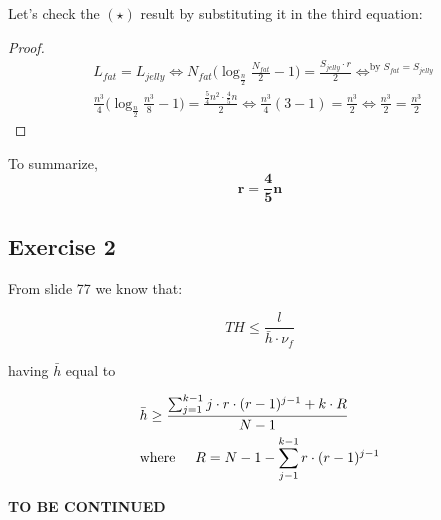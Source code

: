 \documentclass{article}
\begin{document}
Let's check the $(\star)$ result by substituting it in the third equation:

\begin{proof}
    \begin{equation}
        \begin{split}
            &L_{fat} = L_{jelly} \Leftrightarrow N_{fat} \Big(\log_{\frac{n}{2}} \frac{N_{fat}}{2} - 1\Big) = \frac{S_{jelly} \cdot r}{2} \Leftrightarrow^{\text{by } S_{fat} = S_{jelly}}\\ 
            &\frac{n^3}{4} \Big(\log_{\frac{n}{2}} \frac{n^3}{8} - 1\Big) = \frac{\frac{5}{4} n^2 \cdot \frac{4}{5} n}{2} \Leftrightarrow \frac{n^3}{4}(3-1) = \frac{n^3}{2} \Leftrightarrow \frac{n^3}{2} = \frac{n^3}{2}
        \end{split}
    \end{equation}
\end{proof}

To summarize, $$\mathbf{r = \frac{4}{5}n}$$

\subsection{Exercise 2}
From slide 77 we know that:

\begin{equation}
    \tag{Application-oblivious throughput bound}
    TH \leq \frac{l}{\bar{h} \cdot \nu_f}
\end{equation}

having $\bar{h}$ equal to 

\begin{equation}
    \begin{split}
        &\bar{h} \geq \frac{\sum_{j=1}^{k-1} j \cdot r \cdot (r-1)^{j-1} + k \cdot R}{N - 1}\\
        &\text{where} \hspace{5mm} R = N - 1 - \sum_{j-1}^{k-1} r \cdot (r-1)^{j-1}
    \end{split}
\end{equation}

{\huge \textbf{TO BE CONTINUED}}
\end{document}
